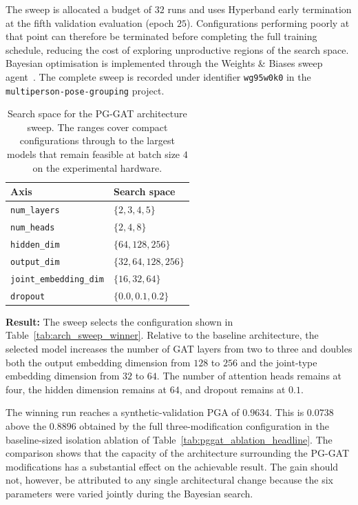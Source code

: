 The sweep is allocated a budget of $32$ runs and uses Hyperband early
termination at the fifth validation evaluation (epoch $25$).
Configurations performing poorly at that point can therefore be
terminated before completing the full training schedule,
reducing the cost of exploring unproductive regions of the search space.
Bayesian optimisation is implemented through the Weights \& Biases sweep
agent~\cite{wandb}.
The complete sweep is recorded under identifier \texttt{wg95w0k0}
in the \texttt{multiperson-pose-grouping} project.

\begin{table}[H]
\centering
\caption[Search space for the PG-GAT architecture sweep.]{Search space for the PG-GAT architecture sweep. The ranges
cover compact configurations through to the largest models that remain
feasible at batch size $4$ on the experimental hardware.}
\label{tab:arch_sweep_space}
\tablesize
\begin{tabular}{ll}
\toprule
Axis & Search space \\
\midrule
\texttt{num\_layers}           & $\{2, 3, 4, 5\}$ \\
\texttt{num\_heads}            & $\{2, 4, 8\}$ \\
\texttt{hidden\_dim}           & $\{64, 128, 256\}$ \\
\texttt{output\_dim}           & $\{32, 64, 128, 256\}$ \\
\texttt{joint\_embedding\_dim} & $\{16, 32, 64\}$ \\
\texttt{dropout}               & $\{0.0, 0.1, 0.2\}$ \\
\bottomrule
\end{tabular}
\end{table}

\textbf{Result:}
The sweep selects the configuration shown in Table~\ref{tab:arch_sweep_winner}.
Relative to the baseline architecture,
the selected model increases the number of GAT layers from two to three
and doubles both the output embedding dimension from $128$ to $256$
and the joint-type embedding dimension from $32$ to $64$.
The number of attention heads remains at four,
the hidden dimension remains at $64$,
and dropout remains at $0.1$.

The winning run reaches a synthetic-validation PGA of $0.9634$.
This is $0.0738$ above the $0.8896$ obtained by the full three-modification
configuration in the baseline-sized isolation ablation of
Table~\ref{tab:pggat_ablation_headline}.
The comparison shows that the capacity of the architecture surrounding
the PG-GAT modifications has a substantial effect on the achievable result.
The gain should not, however, be attributed to any single
architectural change because the six parameters were varied jointly
during the Bayesian search.

